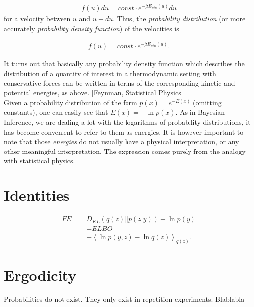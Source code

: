 \begin{align*}
f(u)du = const \cdot e^{-\beta E_{kin}(u)}du
\end{align*}
for a velocity between $u$ and $u+du$. Thus, the \textit{probability distribution} (or more accurately \textit{probability density function}) of the velocities is

\begin{align*}
f(u) = const \cdot e^{-\beta E_{kin}(u)}.
\end{align*}

It turns out that basically any probability density function which describes the distribution of a quantity of interest in a thermodynamic setting with conservative forces can be written in terms of the corresponding kinetic and potential energies, as above. [Feynman, Statistical Physics] \\

\noindent Given a probability distribution of the form $p(x) = e^{-E(x)}$ (omitting constants), one can easily see that $E(x) = -\ln p(x)$. As in Bayesian Inference, we are dealing a lot with the logarithms of probability distributions, it has become convenient to refer to them as energies. It is however important to note that those \textit{energies} do not usually have a physical interpretation, or any other meaningful interpretation. The expression comes purely from the analogy with statistical physics.

\section{Identities}
\begin{align}
FE &= D_{KL}(q(z)||p(z|y)) - \ln p(y) \\
&= -ELBO \\
& = - \left<\ln p(y,z) -\ln q(z) \right>_{q(z)}.
\end{align}

\section{Ergodicity}
Probabilities do not exist. They only exist in repetition experiments. Blablabla
